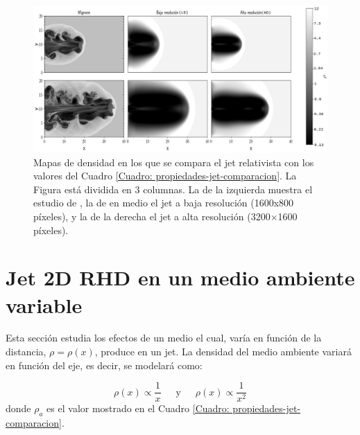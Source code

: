 \documentclass[12pt,a4paper]{book}
\begin{document}
\begin{figure}
  \centering
  \includegraphics[width=1\textwidth]{./Figuras/capitulo_4/comparacion/multiple_comparation.png}
    \caption{Mapas de densidad en los que se compara el jet relativista con los valores del Cuadro 
    \ref{Cuadro: propiedades-jet-comparacion}. La Figura está dividida en 3 columnas. La de la izquierda muestra
    el estudio de \citet{MB-HLLC-I}, la de en medio el jet a baja resolución (1600x800 píxeles), y la de la derecha el jet a alta 
    resolución (3200$\times$1600 píxeles).
    }\label{fig:comparacion_temporal_del_jet}
\end{figure}


\section{Jet 2D RHD en un medio ambiente variable} \label{sec:jet_ambiente_variable}
Esta sección estudia los efectos de un medio el cual, varía en función de la distancia, $\rho = \rho(x)$, 
produce en un jet. La densidad del medio ambiente variará en función del eje, es decir, se modelará como:

\begin{equation}
  \rho(x) \varpropto \frac{1}{x} \,\,\,\,\,\,\,\,\, \text{y} \,\,\,\,\,\,\,\,\, \rho(x) \varpropto \frac{1}{x^2}
\end{equation}
donde $\rho_a$ es el valor mostrado en el Cuadro \ref{Cuadro: propiedades-jet-comparacion}.
\end{document}
